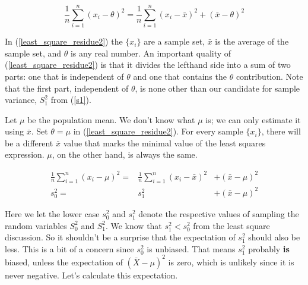 \documentclass[]{article}
\begin{document}
\begin{equation}
\frac{1}{n} \sum_{i=1}^n (x_i - \theta)^2 =
     \frac{1}{n} \sum_{i=1}^n (x_i - \bar{x})^2 + 
     (\bar{x} - \theta)^2 \label{least_square_residue2}
\end{equation}

In (\ref{least_square_residue2}) the ${\{x_i\}}$ are a sample set,
$\bar{x}$ is the average of the sample set, and $\theta$ is
any real number.  An important quality of (\ref{least_square_residue2})
is that it divides the lefthand side into a sum of two parts:
one that is independent of $\theta$ and one that contains the
$\theta$ contribution.  Note that the first part, independent of
$\theta$, is none other than our candidate for sample variance,
$S_1^2$ from (\ref{s1}).

Let $\mu$ be the population mean.  We don't know what $\mu$ is; we
can only estimate it using $\bar{x}$.  Set $\theta = \mu$ in
(\ref{least_square_residue2}).
For every sample $\{x_i\}$, there will be a different $\bar{x}$
value that marks the minimal value of the least squares expression.
$\mu$, on the other hand, is always the same.

\begin{eqnarray}
\frac{1}{n} \sum_{i=1}^n (x_i - \mu)^2
  = & \frac{1}{n} \sum_{i=1}^n (x_i - \bar{x})^2 & +
  (\bar{x} - \mu)^2  \nonumber \\
s_0^2 = & s_1^2 & + (\bar{x} - \mu)^2 \label{var_diff}
\end{eqnarray}

Here we let the lower case $s_0^2$ and $s_1^2$ denote the respective
values of sampling the random variables $S_0^2$ and $S_1^2$.
We know that $s_1^2 < s_0^2$ from the least square discussion.
So it shouldn't be a surprise that the expectation of $s_1^2$
should also be less.  This is a bit of a concern since 
$s_0^2$ is unbiased.  That means $s_1^2$ probably \textbf{is} biased,
unless the expectation of $(\bar{X} - \mu)^2$ is zero, which
is unlikely since it is never negative.  Let's calculate
this expectation.
\end{document}
